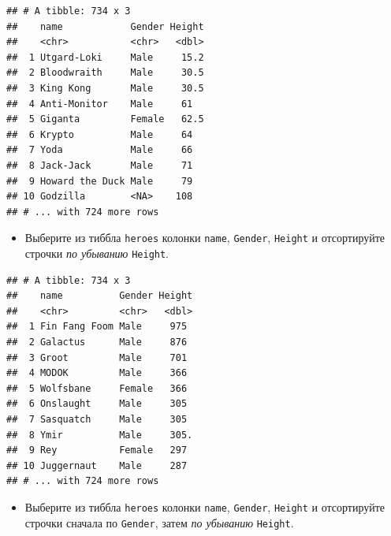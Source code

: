 \documentclass[]{book}
\newenvironment{Shaded}{\begin{snugshade}}{\end{snugshade}}
\newcommand{\KeywordTok}[1]{\textcolor[rgb]{0.13,0.29,0.53}{\textbf{#1}}}
\newcommand{\StringTok}[1]{\textcolor[rgb]{0.31,0.60,0.02}{#1}}
\newcommand{\OperatorTok}[1]{\textcolor[rgb]{0.81,0.36,0.00}{\textbf{#1}}}
\newcommand{\NormalTok}[1]{#1}
\providecommand{\tightlist}{%
  \setlength{\itemsep}{0pt}\setlength{\parskip}{0pt}}
\begin{document}
\begin{verbatim}
## # A tibble: 734 x 3
##    name            Gender Height
##    <chr>           <chr>   <dbl>
##  1 Utgard-Loki     Male     15.2
##  2 Bloodwraith     Male     30.5
##  3 King Kong       Male     30.5
##  4 Anti-Monitor    Male     61  
##  5 Giganta         Female   62.5
##  6 Krypto          Male     64  
##  7 Yoda            Male     66  
##  8 Jack-Jack       Male     71  
##  9 Howard the Duck Male     79  
## 10 Godzilla        <NA>    108  
## # ... with 724 more rows
\end{verbatim}

\begin{itemize}
\tightlist
\item
  Выберите из тиббла \texttt{heroes} колонки \texttt{name},
  \texttt{Gender}, \texttt{Height} и отсортируйте строчки \emph{по
  убыванию} \texttt{Height}.
\end{itemize}

\begin{Shaded}
\end{Shaded}

\begin{verbatim}
## # A tibble: 734 x 3
##    name          Gender Height
##    <chr>         <chr>   <dbl>
##  1 Fin Fang Foom Male     975 
##  2 Galactus      Male     876 
##  3 Groot         Male     701 
##  4 MODOK         Male     366 
##  5 Wolfsbane     Female   366 
##  6 Onslaught     Male     305 
##  7 Sasquatch     Male     305 
##  8 Ymir          Male     305.
##  9 Rey           Female   297 
## 10 Juggernaut    Male     287 
## # ... with 724 more rows
\end{verbatim}

\begin{itemize}
\tightlist
\item
  Выберите из тиббла \texttt{heroes} колонки \texttt{name},
  \texttt{Gender}, \texttt{Height} и отсортируйте строчки сначала по
  \texttt{Gender}, затем \emph{по убыванию} \texttt{Height}.
\end{itemize}

\begin{Shaded}
\end{Shaded}
\end{document}
